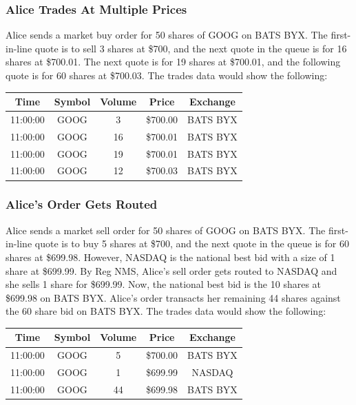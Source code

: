 \documentclass{article}
\begin{document}
\subsubsection{Alice Trades At Multiple Prices}
Alice sends a market buy order for 50 shares of GOOG on BATS BYX. The first-in-line quote is to sell 3 shares at \$700, and the next quote in the queue is for 16 shares at \$700.01. The next quote is for 19 shares at \$700.01, and the following quote is for 60 shares at \$700.03. The trades data would show the following:
\begin{center}
  \begin{tabular}{| c | c | c | c | c |}
    \hline
    Time & Symbol & Volume & Price & Exchange \\ \hline
    11:00:00 & GOOG & 3 & \$700.00 & BATS BYX \\ \hline
    11:00:00 & GOOG & 16 & \$700.01 & BATS BYX \\ \hline
    11:00:00 & GOOG & 19 & \$700.01 & BATS BYX \\ \hline
    11:00:00 & GOOG & 12 & \$700.03 & BATS BYX \\
    \hline
  \end{tabular}
\end{center}
\subsubsection{Alice's Order Gets Routed}
Alice sends a market sell order for 50 shares of GOOG on BATS BYX. The first-in-line quote is to buy 5 shares at \$700, and the next quote in the queue is for 60 shares at \$699.98. However, NASDAQ is the national best bid with a size of 1 share at \$699.99. By Reg NMS, Alice's sell order gets routed to NASDAQ and she sells 1 share for \$699.99. Now, the national best bid is the 10 shares at \$699.98 on BATS BYX. Alice's order transacts her remaining 44 shares against the 60 share bid on BATS BYX. The trades data would show the following:
\begin{center}
  \begin{tabular}{| c | c | c | c | c |}
    \hline
    Time & Symbol & Volume & Price & Exchange \\ \hline
    11:00:00 & GOOG & 5 & \$700.00 & BATS BYX \\ \hline
    11:00:00 & GOOG & 1 & \$699.99 & NASDAQ \\ \hline
    11:00:00 & GOOG & 44 & \$699.98 & BATS BYX \\
    \hline
  \end{tabular}
\end{center}
\end{document}
